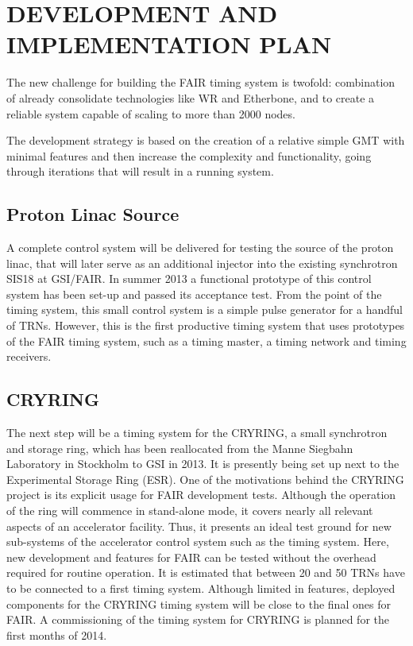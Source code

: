 \section{DEVELOPMENT AND IMPLEMENTATION PLAN}

The new challenge for building the FAIR timing system is
twofold: combination of already consolidate technologies like WR and 
Etherbone, and to create a reliable system capable of scaling
to more than 2000 nodes. 

The development strategy is based on the creation of a relative simple GMT 
with minimal features and then increase the complexity and functionality, going
through iterations that will result in a running system.

\subsection{Proton Linac Source}

A complete control system will  be delivered for testing the source of
the proton linac, that will later serve as an additional injector into
the  existing  synchrotron  SIS18  at  GSI/FAIR.   In  summer  2013  a
functional prototype of this control system has been set-up and passed
its acceptance test.  From the  point of the timing system, this small
control  system is a  simple pulse  generator for  a handful  of TRNs.
However,  this  is  the  first  productive  timing  system  that  uses
prototypes  of the  FAIR timing  system, such  as a  timing  master, a
timing network and timing receivers.

\subsection{CRYRING}

 The next  step will be a  timing system
 for the CRYRING, a small  synchrotron and storage ring, which has been
 reallocated   from  the   Manne  Siegbahn   Laboratory   in  Stockholm
 \cite{CRYRING-ref} to GSI  in 2013. It is presently  being set up next
 to the Experimental Storage Ring (ESR).  One of the motivations behind
 the CRYRING project is its  explicit usage for FAIR development tests.
 Although the operation of the  ring will commence in stand-alone mode,
 it  covers nearly  all relevant  aspects of  an  accelerator facility.
 Thus,  it presents an  ideal test  ground for  new sub-systems  of the
 accelerator  control system  such  as the  timing  system.  Here,  new
 development and features  for FAIR can be tested  without the overhead
 required for routine  operation.  It is estimated that  between 20 and
 50  TRNs have  to be  connected to  a first  timing  system.  Although
 limited in features, deployed components for the CRYRING timing system
 will  be close  to the  final ones  for FAIR.  A commissioning  of the
 timing system for CRYRING is planned for the first months of 2014.


